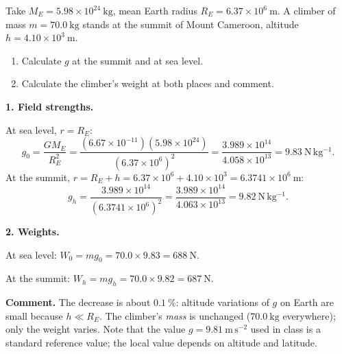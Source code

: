 \documentclass[11pt]{article}
\begin{document}
\begin{exoresolu}
Take $M_E = 5.98\times 10^{24}\ \mathrm{kg}$, mean Earth radius $R_E = 6.37\times 10^{6}\ \mathrm{m}$. A climber of mass $m = 70.0\ \mathrm{kg}$ stands at the summit of Mount Cameroon, altitude $h = 4.10\times 10^{3}\ \mathrm{m}$.
\begin{enumerate}
\item Calculate $g$ at the summit and at sea level.
\item Calculate the climber's weight at both places and comment.
\end{enumerate}
\tcblower
\textbf{1. Field strengths.}

At sea level, $r = R_E$:
\[ g_0 = \frac{GM_E}{R_E^{2}} = \frac{(6.67\times 10^{-11})(5.98\times 10^{24})}{(6.37\times 10^{6})^{2}} = \frac{3.989\times 10^{14}}{4.058\times 10^{13}} = 9.83\ \mathrm{N\,kg^{-1}}. \]
At the summit, $r = R_E + h = 6.37\times 10^{6} + 4.10\times 10^{3} = 6.3741\times 10^{6}\ \mathrm{m}$:
\[ g_h = \frac{3.989\times 10^{14}}{(6.3741\times 10^{6})^{2}} = \frac{3.989\times 10^{14}}{4.063\times 10^{13}} = 9.82\ \mathrm{N\,kg^{-1}}. \]

\textbf{2. Weights.}

At sea level: $W_0 = mg_0 = 70.0\times 9.83 = 688\ \mathrm{N}$.

At the summit: $W_h = mg_h = 70.0\times 9.82 = 687\ \mathrm{N}$.

\textbf{Comment.} The decrease is about $0.1\ \%$: altitude variations of $g$ on Earth are small because $h \ll R_E$. The climber's \emph{mass} is unchanged ($70.0\ \mathrm{kg}$ everywhere); only the weight varies. Note that the value $g = 9.81\ \mathrm{m\,s^{-2}}$ used in class is a standard reference value; the local value depends on altitude and latitude.
\end{exoresolu}
\end{document}
